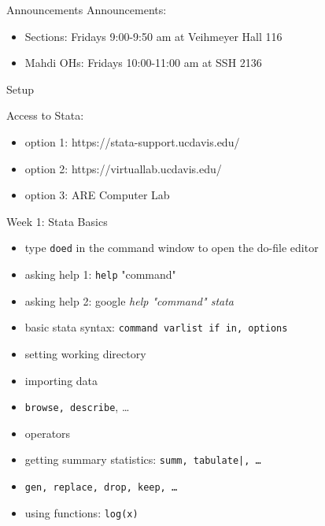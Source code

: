 \documentclass{beamer}
\begin{document}
\begin{frame}{Announcements}
Announcements:
\begin{itemize}
    \item Sections: Fridays 9:00-9:50 am at Veihmeyer Hall 116
    \item Mahdi OHs: Fridays 10:00-11:00 am at SSH 2136  
\end{itemize}
\end{frame}

\begin{frame}{Setup}

Access to Stata:
\begin{itemize}
\item option 1: https://stata-support.ucdavis.edu/
\item option 2: https://virtuallab.ucdavis.edu/
\item option 3: ARE Computer Lab
\end{itemize}
\end{frame}

\begin{frame}{Week 1: Stata Basics}

\begin{itemize}
\item type \texttt{doed} in the command window to open the do-file editor
\item asking help 1: \texttt{help} "command"
\item asking help 2: google \emph{help "command" stata}
\item basic stata syntax: \texttt{command varlist if in, options}
\end{itemize}
        
\begin{itemize}
\item setting working directory
\item importing data
\item \texttt{browse, describe}, \dots
\item operators
\item getting summary statistics: \texttt{summ, tabulate|, \dots}
\item \texttt{gen, replace, drop, keep, \dots}
\item using functions: \texttt{log(x)}
\end{itemize}

\end{frame}
\end{document}
